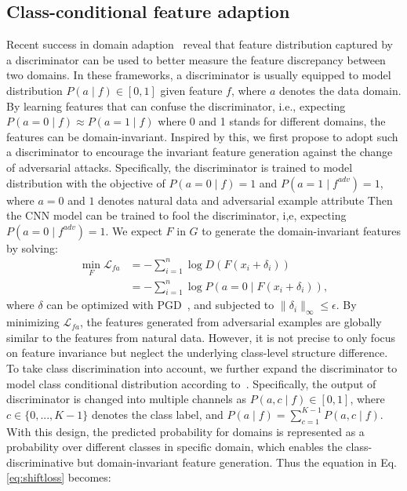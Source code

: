 \documentclass[10pt,twocolumn,letterpaper]{article}
\begin{document}
\subsection{Class-conditional feature adaption}
Recent success in domain adaption~\cite{Haoran_2020_ECCV} reveal that feature distribution captured by a discriminator can be used to better measure the feature discrepancy between two domains. In these frameworks, a discriminator is usually equipped to model distribution $P(a\mid f)\in [0,1]$ given feature $f$, where $a$ denotes the data domain. By learning features that can confuse the discriminator, i.e., expecting $P(a=0\mid f) \approx P(a=1\mid f)$ where 0 and 1 stands for different domains, the features can be domain-invariant. Inspired by this, we first propose to adopt such a discriminator to encourage the invariant feature generation against the change of adversarial attacks. Specifically, the discriminator is trained to model distribution with the objective of $P(a=0\mid f)=1$ and $P(a=1\mid f^{adv})=1$, where $a=0$ and $1$ denotes natural data and adversarial example attribute
Then the CNN model can be trained to fool the discriminator, i,e, expecting $P(a=0\mid f^{adv}) = 1$. We expect $F$ in $G$ to generate the domain-invariant features by solving:
\begin{equation}
\begin{aligned}
\label{eq:shiftloss}
		\min _{F} \mathcal{L}_{fa}&=-\sum \limits_{i=1} ^{n}\log D( F(x_i+\delta_i))\\
		&=-\sum \limits_{i=1} ^{n}\log P(a=0\mid F(x_i+\delta_i)),
	  \end{aligned}
\end{equation}
where $\delta$ can be optimized with PGD~\cite{madry2018towards}, and subjected to $\|\delta_i\|_{\infty} \leq \epsilon$. By minimizing $\mathcal{L}_{fa}$, the features generated from adversarial examples are globally similar to the features from natural data. However, it is not precise to only focus on feature invariance but neglect the underlying class-level structure difference. To take class discrimination into account, we further expand the discriminator to model class conditional distribution according to~\cite{Haoran_2020_ECCV}. Specifically, the output of discriminator is changed into multiple channels as $P(a, c\mid f)\in [0,1]$, where $c\in \{0,...,K-1\}$ denotes the class label, and $P(a\mid f)=\sum_{c=1}^{K-1} P(a,c\mid f)$. With this design, the predicted probability for domains is represented as a probability over different classes in specific domain, which enables the class-discriminative but domain-invariant feature generation. Thus the equation in Eq.\,\eqref{eq:shiftloss} becomes:
\end{document}
